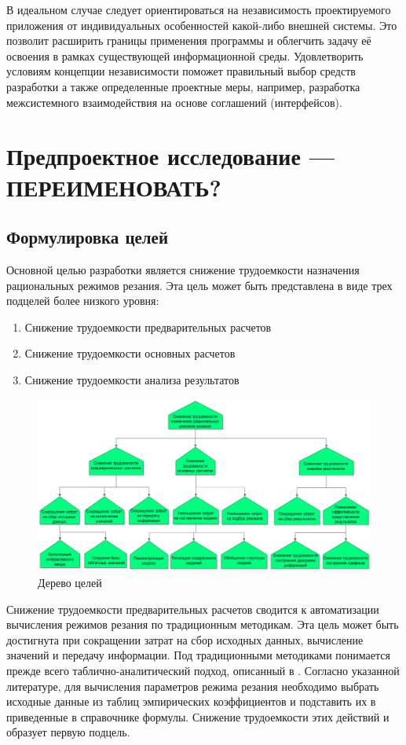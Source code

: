 \documentclass[14pt,oneside,final]{extreport}
\begin{document}
	В идеальном случае следует ориентироваться на независимость проектируемого приложения от индивидуальных особенностей какой-либо внешней системы. Это позволит расширить границы применения программы и облегчить задачу её освоения в рамках существующей информационной среды. Удовлетворить условиям концепции независимости поможет правильный выбор средств разработки а также определенные проектные меры, например, разработка межсистемного взаимодействия на основе соглашений (интерфейсов). 
	
	\chapter{Предпроектное исследование --- ПЕРЕИМЕНОВАТЬ?}
	\section{Формулировка целей}
	Основной целью разработки является снижение трудоемкости назначения рациональных режимов резания. Эта цель может быть представлена в виде трех подцелей более низкого уровня: 
	\begin{enumerate}
	\item Снижение трудоемкости предварительных расчетов
	\item Снижение трудоемкости основных расчетов
	\item Снижение трудоемкости анализа результатов 
	\end{enumerate}
	\begin{figure}[!h]
	\begin{center}
	\includegraphics[scale=0.55]{img/at} 
	\end{center}
	\caption{Дерево целей}
	\label{fig:aim-tree}
	\end{figure}
	
	Снижение трудоемкости предварительных расчетов сводится к автоматизации вычисления режимов резания по традиционным методикам. Эта цель может быть достигнута при сокращении затрат на сбор исходных данных, вычисление значений и передачу информации. Под традиционными методиками понимается прежде всего таблично-аналитический подход, описанный в \cite{book:Kosilova}. Согласно указанной литературе, для вычисления параметров режима резания необходимо выбрать исходные данные из таблиц эмпирических коэффициентов и подставить их в приведенные в справочнике формулы. Снижение трудоемкости этих действий и образует первую подцель.
	
\end{document}
